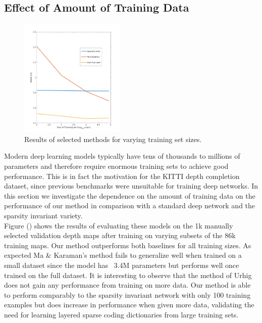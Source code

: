 \subsection{Effect of Amount of Training Data}
\label{sec:effect-training-data}
\begin{figure}
\includegraphics[width=0.45\textwidth]{trainsizeplot}
  \caption{Results of selected methods for varying training set sizes.}
  \label{fig:trainsize}
\end{figure}
Modern deep learning models typically have tens of thousands to millions of parameters and therefore require enormous training sets to achieve good performance. This is in fact the motivation for the KITTI depth completion dataset, since previous benchmarks were unsuitable for training deep networks. In this section we investigate the dependence on the amount of training data on the performance of our method in comparison with a standard deep network and the sparsity invariant variety.\\
Figure () shows the results of evaluating these models on the 1k manually selected validation depth maps after training on varying subsets of the 86k training maps. Our method outperforms both baselines for all training sizes. As expected Ma \& Karaman's method fails to generalize well when trained on a small dataset since the model has ~3.4M parameters but performs well once trained on the full dataset. It is interesting to observe that the method of Urhig \etal does not gain any performance from training on more data. Our method is able to perform comparably to the sparsity invariant network with only 100 training examples but does increase in performance when given more data, validating the need for learning layered sparse coding dictionaries from large training sets.
